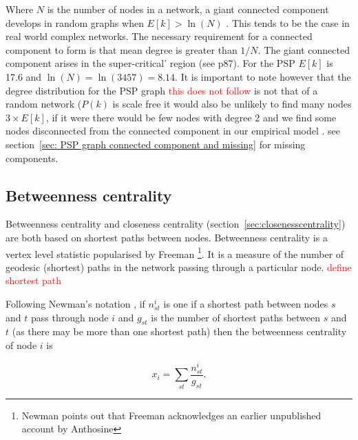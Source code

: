 Where $N$ is the number of nodes in a network, a giant connected component develops in random graphs when $E[k] > \ln (N)$ \cite{barabasi2016network}. This tends to be the case in real world complex networks. The necessary requirement for a connected component to form is that mean degree is greater than $1/N$. The giant connected component arises in the super-critical' region (see \cite{barabasi2016network} p87). For the PSP $E[k]$ is 17.6 and $\ln(N)=\ln(3457)=8.14$.  It is important to note however that the degree distribution for the PSP graph \textcolor{red}{this does not follow} is not that of a random network ($P(k)$ is scale free it would also be unlikely to find many nodes $ 3 \times E[k]$, if it were there would be few nodes with degree 2 and we find some nodes disconnected from the connected component in our empirical model .   see section~\ref{sec: PSP graph connected component and missing} for missing components.







\subsection{Betweenness centrality }
\label{sec:Betweeness centrality}
Betweenness centrality and closeness centrality (section~\ref{sec:closenesscentrality})  are both based on shortest paths between nodes.\cite{newman2018networks} Betweenness centrality is a vertex level statistic popularised by Freeman \cite{freeman1977set} \footnote{Newman \cite{newman2018networks} points out that Freeman acknowledges an earlier unpublished account by Anthosine}. It is a measure of the number of geodesic (shortest) paths in the network passing through a particular node. \textcolor{red}{define shortest path} 

 Following Newman's notation \cite{newman2018networks}, if $n_{st}^i$ is one if a shortest path between nodes $s$ and $t$ pass through node $i$ and  $g_{st}$ is the number of shortest paths between $s$ and $t$ (as there may be more than one shortest path) then the betweenness centrality of node $i$ is

\begin{equation}
    x_i = \sum_{st} \frac{n_{st}^i}{g_{st}}.
\end{equation}
\label{eq: Betweenness centrality}

